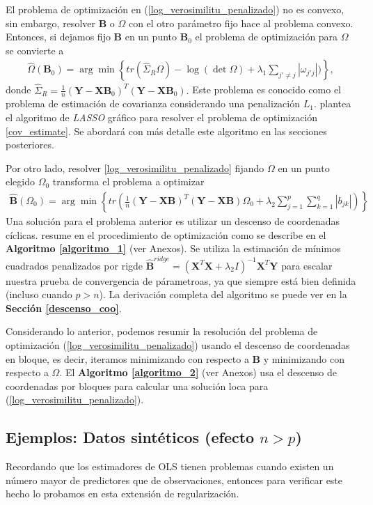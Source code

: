\documentclass{article}
\newcommand{\X}{\mathbf{X}}
\newcommand{\Y}{\mathbf{Y}}
\newcommand{\B}{\mathbf{B}}
\begin{document}
El problema de optimización en (\ref{log_verosimilitu_penalizado}) no es convexo, sin embargo, resolver $\B$ o $\Omega$ con el otro parámetro fijo hace al problema convexo. Entonces, si dejamos fijo $\B$ en un punto $\B_0$ el problema de optimización para $\Omega$ se convierte a 
\begin{align} \label{cov_estimate}
    \hat{\Omega}(\B_0) = \arg \min \left\{ tr \left(\hat{\Sigma}_R \Omega \right)-\log(\det\Omega) +\lambda_1\sum_{j'\neq j}|\omega_{j'j}|)\right\},
\end{align}
donde $\hat{\Sigma}_R=\frac{1}{n}(\Y-\X\B_0)^T(\Y-\X\B_0).$ Este problema es conocido como el problema de estimación de covarianza considerando una penalización $L_1$. \cite{friedman_sparse_2008} plantea el algoritmo de \textit{LASSO} gráfico para resolver el problema de optimización \ref{cov_estimate}. Se abordará con más detalle este algoritmo en las secciones posteriores.

Por otro lado, resolver \ref{log_verosimilitu_penalizado} fijando $\Omega$ en un punto elegido $\Omega_0$ transforma el problema a optimizar
\begin{align}\label{est_beta}
    \hat{\B}(\Omega_0) = \arg \min \left\{ tr \left( \frac{1}{n}(\Y-\X\B)^T(\Y-\X\B)\Omega_0+\lambda_2 \sum_{j=1}^p\sum_{k=1}^q |b_{jk}| \right) \right\}
\end{align}
Una solución para el problema anterior es utilizar un descenso de coordenadas cíclicas. \cite{mrce} resume en el procedimiento de optimización como se describe en el \textbf{Algoritmo \ref{algoritmo_1}} (ver Anexos). Se utiliza la estimación de mínimos cuadrados penalizados por rigde $\hat{\B}^{ridge}=(\X^T\X+\lambda_2I)^{-1}\X^T\Y$ para escalar nuestra prueba de convergencia de párametroas, ya que siempre está bien definida (incluso cuando $p>n$). La derivación completa del algoritmo se puede ver en la \textbf{Sección \ref{descenso_coo}}.

Considerando lo anterior, podemos resumir la resolución del problema de optimización (\ref{log_verosimilitu_penalizado}) usando el descenso de coordenadas en bloque, es decir, iteramos minimizando con respecto a $\B$ y minimizando con respecto a $\Omega$. El \textbf{Algoritmo \ref{algoritmo_2}} (ver Anexos) usa el descenso de coordenadas por bloques para calcular una solución loca para (\ref{log_verosimilitu_penalizado}). 

\subsection{Ejemplos: Datos sintéticos (efecto $n>p$)}
Recordando que los estimadores de OLS tienen problemas cuando existen un número mayor de predictores que de observaciones, entonces para verificar este hecho lo probamos en esta extensión de regularización. 
\end{document}
